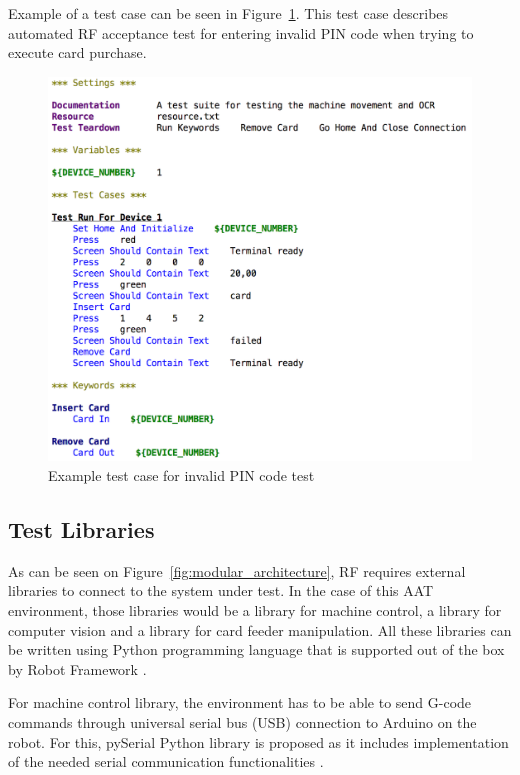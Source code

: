 Example of a test case can be seen in Figure~\ref{fig:invalid_pin_test}. This test case describes automated RF acceptance test for entering invalid PIN code when trying to execute card purchase.

\begin{figure}[ht]
  \begin{center}
    \includegraphics[width=\textwidth]{images/example_test.png}
    \caption{Example test case for invalid PIN code test}
    \label{fig:invalid_pin_test}
  \end{center}
\end{figure}

\FloatBarrier
\subsection{Test Libraries}
\label{subsection:test libraries}

As can be seen on Figure~\ref{fig:modular_architecture}, RF requires external libraries to connect to the system under test. In the case of this AAT environment, those libraries would be a library for machine control, a library for computer vision and a library for card feeder manipulation. All these libraries can be written using Python programming language that is supported out of the box by Robot Framework \citep{robotframework}.

For machine control library, the environment has to be able to send G-code commands through universal serial bus (USB) connection to Arduino on the robot. For this, pySerial Python library is proposed as it includes implementation of the needed serial communication functionalities \citep{pyserial}.

